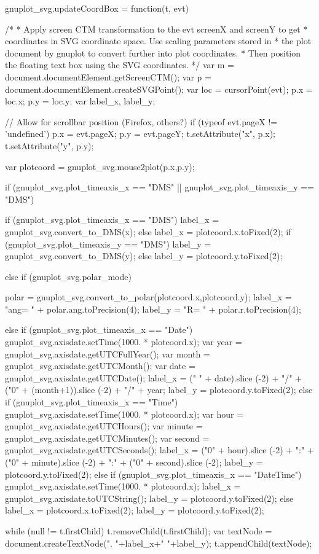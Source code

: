 gnuplot_svg.updateCoordBox = function(t, evt) {
    /* 
     * Apply screen CTM transformation to the evt screenX and screenY to get 
     * coordinates in SVG coordinate space.  Use scaling parameters stored in
     * the plot document by gnuplot to convert further into plot coordinates.
     * Then position the floating text box using the SVG coordinates.
     */
    var m = document.documentElement.getScreenCTM();
    var p = document.documentElement.createSVGPoint(); 
    var loc = cursorPoint(evt);
    p.x = loc.x;
    p.y = loc.y;
    var label_x, label_y;

    // Allow for scrollbar position (Firefox, others?)
    if (typeof evt.pageX != 'undefined') {
        p.x = evt.pageX; p.y = evt.pageY; 
    }
    t.setAttribute("x", p.x);
    t.setAttribute("y", p.y);
   
    var plotcoord = gnuplot_svg.mouse2plot(p.x,p.y);

    if (gnuplot_svg.plot_timeaxis_x == "DMS" || gnuplot_svg.plot_timeaxis_y == "DMS") {
	if (gnuplot_svg.plot_timeaxis_x == "DMS")
	    label_x = gnuplot_svg.convert_to_DMS(x);
	else
	    label_x = plotcoord.x.toFixed(2);
	if (gnuplot_svg.plot_timeaxis_y == "DMS")
	    label_y = gnuplot_svg.convert_to_DMS(y);
	else
	    label_y = plotcoord.y.toFixed(2);

    } else if (gnuplot_svg.polar_mode) {
	polar = gnuplot_svg.convert_to_polar(plotcoord.x,plotcoord.y);
	label_x = "ang= " + polar.ang.toPrecision(4);
	label_y = "R= " + polar.r.toPrecision(4);

    } else if (gnuplot_svg.plot_timeaxis_x == "Date") {
	gnuplot_svg.axisdate.setTime(1000. * plotcoord.x);
	var year = gnuplot_svg.axisdate.getUTCFullYear();
	var month = gnuplot_svg.axisdate.getUTCMonth();
	var date = gnuplot_svg.axisdate.getUTCDate();
	label_x = (" " + date).slice (-2) + "/"
		+ ("0" + (month+1)).slice (-2) + "/"
		+ year;
	label_y = plotcoord.y.toFixed(2);
    } else if (gnuplot_svg.plot_timeaxis_x == "Time") {
	gnuplot_svg.axisdate.setTime(1000. * plotcoord.x);
	var hour = gnuplot_svg.axisdate.getUTCHours();
	var minute = gnuplot_svg.axisdate.getUTCMinutes();
	var second = gnuplot_svg.axisdate.getUTCSeconds();
	label_x = ("0" + hour).slice (-2) + ":" 
		+ ("0" + minute).slice (-2) + ":"
		+ ("0" + second).slice (-2);
	label_y = plotcoord.y.toFixed(2);
    } else if (gnuplot_svg.plot_timeaxis_x == "DateTime") {
	gnuplot_svg.axisdate.setTime(1000. * plotcoord.x);
	label_x = gnuplot_svg.axisdate.toUTCString();
	label_y = plotcoord.y.toFixed(2);
    } else {
	label_x = plotcoord.x.toFixed(2);
	label_y = plotcoord.y.toFixed(2);
    }

    while (null != t.firstChild) {
    	t.removeChild(t.firstChild);
    }
    var textNode = document.createTextNode(".  "+label_x+" "+label_y);
    t.appendChild(textNode);
}

